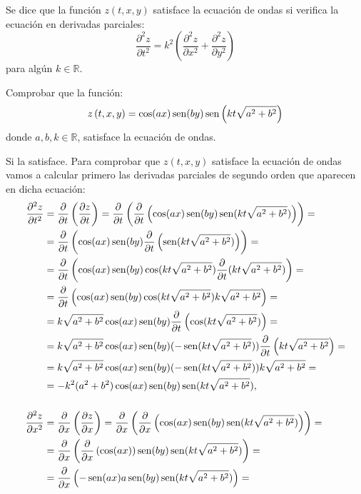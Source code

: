 {Se  dice que la función $z(t,x,y)$ satisface la ecuación de ondas si verifica la ecuación en derivadas parciales:
\[
\frac{{\partial ^2 z}} {{\partial t^2 }} = k^2 \left(
{\frac{{\partial ^2 z}} {{\partial x^2 }} + \frac{{\partial ^2 z}}
{{\partial y^2 }}} \right)
\]
para algún $k\in \mathbb{R}$.

Comprobar que la función:
\[
z\left( {t,x,y} \right) = \cos (ax)\operatorname{sen}(by)\operatorname{sen}\left( {kt\sqrt
{a^2 + b^2 } } \right)
\]
donde $a,b,k \in \mathbb{R}$, satisface la ecuación de ondas.
}
{Si la satisface.
}
{Para comprobar que $z(t,x,y)$ satisface la ecuación de ondas vamos a calcular primero las derivadas parciales de segundo orden que aparecen en dicha ecuación:
\begin{align*}
\frac{\partial^2 z}{\partial t^2} &=
\frac{\partial}{\partial t}\left(\frac{\partial z}{\partial t}\right) =
\frac{\partial}{\partial t}\left(\frac{\partial}{\partial t}\left(\cos(ax)\sen(by)\sen(kt\sqrt{a^2+b^2})\right)\right)= \\
&= \frac{\partial}{\partial t}\left(\cos(ax)\sen(by)\frac{\partial}{\partial t}\left(\sen(kt\sqrt{a^2+b^2})\right)\right)=\\
&= \frac{\partial}{\partial t}\left(\cos(ax)\sen(by)\cos(kt\sqrt{a^2+b^2})\frac{\partial}{\partial t}(kt\sqrt{a^2+b^2})\right)=\\
&= \frac{\partial}{\partial t}\left(\cos(ax)\sen(by)\cos(kt\sqrt{a^2+b^2}) k\sqrt{a^2+b^2}\right)=\\
&= k\sqrt{a^2+b^2}\cos(ax)\sen(by)\frac{\partial}{\partial t}\left(\cos(kt\sqrt{a^2+b^2}) \right)=\\
&= k\sqrt{a^2+b^2}\cos(ax)\sen(by)(-\sen(kt\sqrt{a^2+b^2}))\frac{\partial}{\partial t}\left(kt\sqrt{a^2+b^2}\right)=\\
&=k\sqrt{a^2+b^2}\cos(ax)\sen(by)(-\sen(kt\sqrt{a^2+b^2}))k\sqrt{a^2+b^2}=\\
&= -k^2(a^2+b^2)\cos(ax)\sen(by)\sen(kt\sqrt{a^2+b^2}),\\[.5cm]
\frac{\partial^2 z}{\partial x^2} &=
\frac{\partial}{\partial x}\left(\frac{\partial z}{\partial x}\right)
= \frac{\partial}{\partial x}\left(\frac{\partial}{\partial x}\left(\cos(ax)\sen(by)\sen(kt\sqrt{a^2+b^2})\right)\right)= \\
&= \frac{\partial}{\partial x}\left(\frac{\partial}{\partial x}\left(\cos(ax)\right)\sen(by)\sen(kt\sqrt{a^2+b^2})\right)=\\
&= \frac{\partial}{\partial x}\left(-\sen(ax)a\sen(by)\sen(kt\sqrt{a^2+b^2})\right)=\\

\end{align*}}
